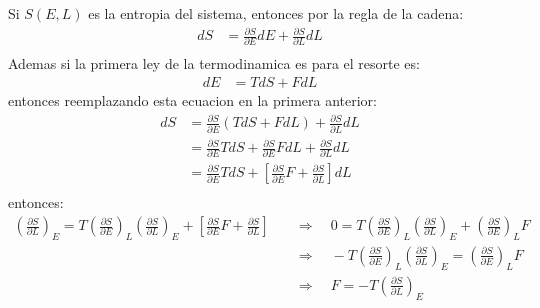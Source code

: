 \begin{answer}
    Si $S(E,L)$ es la entropia del sistema, entonces por la regla de la cadena:
    \begin{align*}
        d S &= \frac{\partial S}{\partial E} d E + \frac{\partial S}{\partial L} d L\\
    \end{align*}
    Ademas si la primera ley de la termodinamica es para el resorte es:
    \begin{align*}
        d E &= TdS + F d L
    \end{align*}
    entonces reemplazando esta ecuacion en la primera anterior:
    \begin{align*}
        d S &= \frac{\partial S}{\partial E} \left( TdS + F d L \right) + \frac{\partial S}{\partial L} d L\\
        &= \frac{\partial S}{\partial E} TdS + \frac{\partial S}{\partial E} F d L+ \frac{\partial S}{\partial L} d L\\
        &= \frac{\partial S}{\partial E} TdS + \left[
            \frac{\partial S}{\partial E} F + \frac{\partial S}{\partial L}
        \right] d L\\
    \end{align*}
    entonces:
    \begin{align*}
        \left(\frac{\partial S}{\partial L}\right)_{E} = T \left(\frac{\partial S}{\partial E}\right)_{L} \left(
            \frac{\partial S}{\partial L}
        \right)_E + \left[
            \frac{\partial S}{\partial E} F + \frac{\partial S}{\partial L}
        \right] &\quad \Rightarrow \quad  0 = T \left(\frac{\partial S}{\partial E}\right)_{L} \left(
            \frac{\partial S}{\partial L}
        \right)_E + 
            \left(\frac{\partial S}{\partial E}\right)_L F\\
        &\quad \Rightarrow \quad  -T \left(\frac{\partial S}{\partial E}\right)_{L} \left(
            \frac{\partial S}{\partial L}
        \right)_E =
            \left(\frac{\partial S}{\partial E}\right)_L F\\
        &\quad \Rightarrow \quad  F = -T \left(
            \frac{\partial S}{\partial L}
        \right)_E
    \end{align*}
\end{answer}
